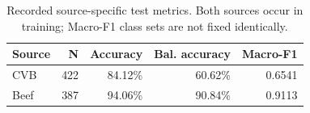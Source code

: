 \begin{table}[htbp]
\centering\small
\caption[Source-specific Behavior results]{Recorded source-specific test metrics. Both sources occur in training; Macro-F1 class sets are not fixed identically.}\label{tab:behsources}
\begin{tabular}{lrrrr}
\toprule
Source & N & Accuracy & Bal. accuracy & Macro-F1 \\
\midrule
CVB & 422 & 84.12\% & 60.62\% & 0.6541 \\
Beef & 387 & 94.06\% & 90.84\% & 0.9113 \\
\bottomrule
\end{tabular}
\end{table}
